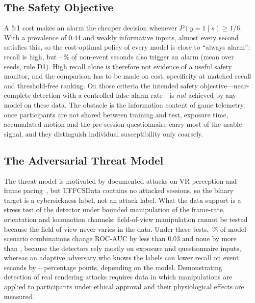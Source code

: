 \subsection{The Safety Objective}
A 5:1 cost makes an alarm the cheaper decision whenever $P(y=1\mid s)\ge1/6$. With a prevalence of 0.44 and weakly informative inputs, almost every second satisfies this, so the cost-optimal policy of every model is close to ``always alarm'': recall is high, but \DOneFPRMin--\DOneFPRMax\,\% of non-event seconds also trigger an alarm (mean over seeds, rule D1). High recall alone is therefore not evidence of a useful safety monitor, and the comparison has to be made on cost, specificity at matched recall and threshold-free ranking. On those criteria the intended safety objective---near-complete detection with a controlled false-alarm rate---is \emph{not} achieved by any model on these data. The obstacle is the information content of game telemetry: once participants are not shared between training and test, exposure time, accumulated motion and the pre-session questionnaire carry most of the usable signal, and they distinguish individual susceptibility only coarsely.

\subsection{The Adversarial Threat Model}
The threat model is motivated by documented attacks on VR perception and frame pacing~\cite{odeleye2021framerate,tseng2022dark,kundu2025securing}, but UFFCSData contains no attacked sessions, so the binary target is a cybersickness label, not an attack label. What the data support is a stress test of the detector under bounded manipulation of the frame-rate, orientation and locomotion channels; field-of-view manipulation cannot be tested because the field of view never varies in the data. Under these tests, \AttAucFracSmall\,\% of model--scenario combinations change ROC-AUC by less than 0.03 and none by more than \AttAucMaxAbsChange, because the detectors rely mostly on exposure and questionnaire inputs, whereas an adaptive adversary who knows the labels can lower recall on event seconds by \AttEvasionDropMin--\AttEvasionDropMax{} percentage points, depending on the model. Demonstrating detection of real rendering attacks requires data in which manipulations are applied to participants under ethical approval and their physiological effects are measured.

